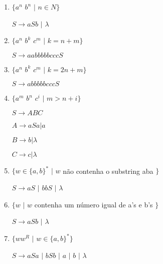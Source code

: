 \begin{question}

	\begin{enumerate}[label=\textbf{\alph*})]
		\item 
		$\{a^{n}$ $b^{n}$ $ |$ $ n \in N \}$

		$S \rightarrow aSb $ $ | $ $ \lambda  $
		
		\item 
		$\{a^{n}$ $b^{k}$ $c^{m}$ $ |$ $ k = n+m \}$
		
		$S \rightarrow aabbbbbcccS   $
		
		\item 
		$\{a^{n}$ $b^{k}$ $c^{m}$ $ |$ $ k = 2n+m \}$
		
		$S \rightarrow abbbbbcccS   $
		
		\item 
		$\{a^{m}$ $b^{n}$ $c^{i}$ $ |$ $ m > n+i \}$
		
		$S \rightarrow ABC  $
		
		$A \rightarrow aSa | a  $
		
		$B \rightarrow b | \lambda  $
		
		$C \rightarrow c | \lambda  $
		
		\item 
		$\{w \in \{ a,b \}^{*}$ $ |$ $ w $ não contenha o substring aba $ \}$
		
		$S \rightarrow aS $ $ | $ $ bbS $ $ | $ $ \lambda   $
		
		\item 
		$\{w $ $ |$ $ w $ contenha um número igual de a's e b's $ \}$
		
		$S \rightarrow aSb $ $ | $ $ \lambda  $
		
		\item 
		$\{ww^{R}  $ $ |$ $ w \in \{ a,b \}^{*} \}$
		
		$S \rightarrow aSa $ $ | $ $ bSb $ $ | $ $ a  $ $ | $ $ b  $ $ | $ $ \lambda  $
		
	\end{enumerate}
\end{question}

\newpage
